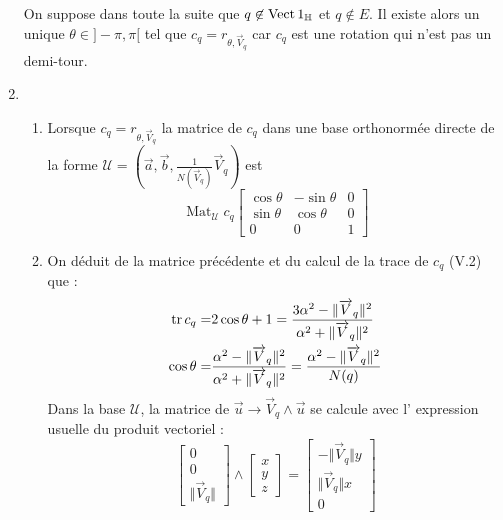 \begin{enumerate}
On suppose dans toute la suite que $q\not \in \operatorname{Vect} 1_{\mathbb{H}}$ et $q\not \in E$. Il existe alors un unique $\theta \in ]-\pi , \pi[$ tel que  $c_q=r_{\theta , \overrightarrow{V}_q}$ car $c_q$ est une rotation qui n'est pas un demi-tour.
\item
\begin{enumerate}
 \item Lorsque $c_q=r_{\theta , \overrightarrow{V}_q}$ la matrice de $c_q$ dans une base orthonormée directe de la forme $\mathcal U = (\overrightarrow{a}, \overrightarrow{b}, \frac{1}{N(\overrightarrow{V}_q)}\overrightarrow{V}_q)$ est 
\begin{displaymath}
\mathop{\mathrm{Mat}}_{\mathcal U} c_q
 \begin{bmatrix}
  \cos \theta & -\sin \theta & 0 \\
  \sin \theta & \cos \theta & 0 \\
  0 & 0 & 1 
 \end{bmatrix}
\end{displaymath}
\item On déduit de la matrice précédente et du calcul de la trace de $c_q$ (V.2) que :
\begin{align*}
 \operatorname{tr} c_q =& 2\cos \theta + 1 = \dfrac{3\alpha^2 - \Vert \overrightarrow V_q \Vert^2}{\alpha^2 + \Vert \overrightarrow V_q \Vert^2} \\
\cos \theta =& \dfrac{\alpha^2 - \Vert \overrightarrow V_q \Vert^2}{\alpha^2 + \Vert \overrightarrow V_q \Vert^2}
=  \dfrac{\alpha^2 - \Vert \overrightarrow V_q \Vert^2}{N(q)}
\end{align*}
Dans la base $\mathcal U$, la matrice de $\overrightarrow u \rightarrow \overrightarrow V_q \wedge \overrightarrow u$ se calcule avec l' expression usuelle du produit vectoriel :
\begin{displaymath}
 \begin{bmatrix}
  0 \\
  0 \\
 \Vert \overrightarrow V_q \Vert
 \end{bmatrix}
\wedge
 \begin{bmatrix}
  x \\
  y \\
 z
 \end{bmatrix}
= \begin{bmatrix}
   -\Vert \overrightarrow V_q \Vert y \\
  \Vert \overrightarrow V_q \Vert x \\
0
  \end{bmatrix}

\end{displaymath}
\end{enumerate}
\end{enumerate}
